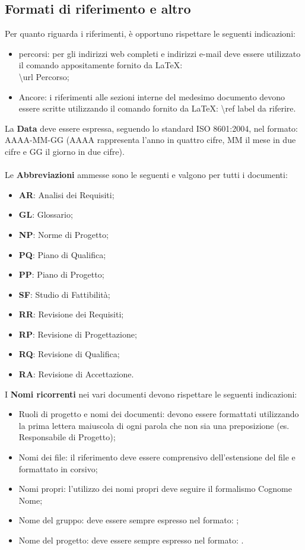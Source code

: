 {		\subsection{Formati di riferimento e altro}{
			\label{sub:rif}
			Per quanto riguarda i riferimenti, è opportuno rispettare le seguenti indicazioni:
			\begin{itemize}
				\item percorsi: per gli indirizzi\ped{g} web completi e indirizzi e-mail deve essere utilizzato il comando appositamente fornito da \LaTeX:\\ \textbackslash url \textbraceleft Percorso\textbraceright;
				\item Ancore: i riferimenti alle sezioni interne del medesimo documento devono essere scritte utilizzando il comando fornito da \LaTeX: \textbackslash ref \textbraceleft label da riferire\textbraceright .
			\end{itemize}
			La \textbf{Data} deve essere espressa, seguendo lo standard ISO 8601:2004, nel formato: AAAA-MM-GG (AAAA rappresenta l'anno in quattro cifre, MM il mese in due cifre e GG il giorno in due cifre).\\
			\\
			Le \textbf{Abbreviazioni} ammesse sono le seguenti e valgono per tutti i documenti:
			\begin{itemize}
				\item \textbf{AR}: Analisi dei Requisiti;
				\item \textbf{GL}: Glossario;
				\item \textbf{NP}: Norme di Progetto;
				\item \textbf{PQ}: Piano di Qualifica;
				\item \textbf{PP}: Piano di Progetto;
				\item \textbf{SF}: Studio di Fattibilità;
				\item \textbf{RR}: Revisione dei Requisiti;
				\item \textbf{RP}: Revisione di Progettazione;
				\item \textbf{RQ}: Revisione di Qualifica;
				\item \textbf{RA}: Revisione di Accettazione.
			\end{itemize}
			I \textbf{Nomi ricorrenti} nei vari documenti devono rispettare le seguenti indicazioni:
			\begin{itemize}
				\item Ruoli di progetto e nomi dei documenti: devono essere formattati utilizzando la prima lettera maiuscola di ogni parola che non sia una preposizione (es. Responsabile di Progetto);
				\item Nomi dei file: il riferimento deve essere comprensivo dell’estensione\ped{g} del file e formattato in corsivo;
				\item Nomi propri: l’utilizzo dei nomi propri deve seguire il formalismo Cognome Nome;
				\item Nome del gruppo: deve essere sempre espresso nel formato: \gruppo;
				\item Nome del progetto: deve essere sempre espresso nel formato: \premi.
			\end{itemize}
			}
}
